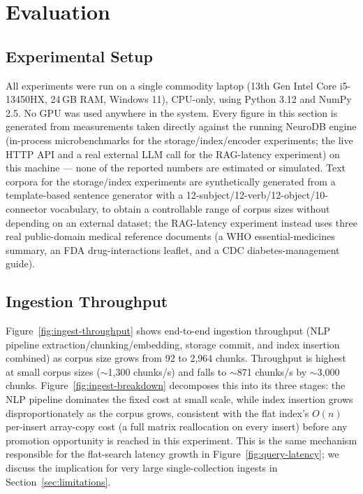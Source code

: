 \documentclass[conference]{IEEEtran}
\begin{document}
\section{Evaluation}
\label{sec:evaluation}

\subsection{Experimental Setup}

All experiments were run on a single commodity laptop (13th Gen Intel Core i5-13450HX,
24\,GB RAM, Windows 11), CPU-only, using Python 3.12 and NumPy 2.5. No GPU was used anywhere
in the system. Every figure in this section is generated from measurements taken directly
against the running NeuroDB engine (in-process microbenchmarks for the storage/index/encoder
experiments; the live HTTP API and a real external LLM call for the RAG-latency experiment)
on this machine --- none of the reported numbers are estimated or simulated. Text corpora
for the storage/index experiments are synthetically generated from a template-based sentence
generator with a 12-subject/12-verb/12-object/10-connector vocabulary, to obtain a
controllable range of corpus sizes without depending on an external dataset; the RAG-latency
experiment instead uses three real public-domain medical reference documents (a WHO
essential-medicines summary, an FDA drug-interactions leaflet, and a CDC diabetes-management
guide).

\subsection{Ingestion Throughput}
\label{sec:eval-ingest}

Figure~\ref{fig:ingest-throughput} shows end-to-end ingestion throughput (NLP pipeline
extraction/chunking/embedding, storage commit, and index insertion combined) as corpus size
grows from 92 to 2{,}964 chunks. Throughput is highest at small corpus sizes ($\sim$1{,}300
chunks/s) and falls to $\sim$871 chunks/s by $\sim$3{,}000 chunks. Figure~\ref{fig:ingest-breakdown}
decomposes this into its three stages: the NLP pipeline dominates the fixed cost at small
scale, while index insertion grows disproportionately as the corpus grows, consistent with
the flat index's $O(n)$ per-insert array-copy cost (a full matrix reallocation on every
insert) before any promotion opportunity is reached in this experiment. This is the same
mechanism responsible for the flat-search latency growth in Figure~\ref{fig:query-latency};
we discuss the implication for very large single-collection ingests in
Section~\ref{sec:limitations}.
\end{document}
